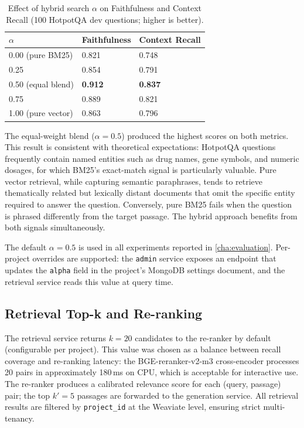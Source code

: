 \begin{table}[htbp]
  \centering
  \caption[Effect of hybrid search \(\alpha\) on RAGAS metrics.]{Effect of hybrid search \(\alpha\) on Faithfulness and Context Recall (100 HotpotQA dev questions; higher is better).}
  \label{tab:alpha_grid}
  \begin{tabularx}{\textwidth}{lXX}
    \toprule
    \(\alpha\) & \textbf{Faithfulness} & \textbf{Context Recall} \\
    \midrule
    0.00 (pure BM25)    & 0.821 & 0.748 \\
    0.25                & 0.854 & 0.791 \\
    0.50 (equal blend)  & \textbf{0.912} & \textbf{0.837} \\
    0.75                & 0.889 & 0.821 \\
    1.00 (pure vector)  & 0.863 & 0.796 \\
    \bottomrule
  \end{tabularx}
\end{table}

The equal-weight blend (\(\alpha = 0.5\)) produced the highest scores on
both metrics.  This result is consistent with theoretical expectations: HotpotQA
questions frequently contain named entities such as drug names, gene symbols,
and numeric dosages, for which BM25's exact-match signal is particularly
valuable.  Pure vector retrieval, while capturing semantic paraphrases, tends
to retrieve thematically related but lexically distant documents that omit the
specific entity required to answer the question.  Conversely, pure BM25
fails when the question is phrased differently from the target passage.  The
hybrid approach benefits from both signals simultaneously.

The default \(\alpha = 0.5\) is used in all experiments reported in
\cref{cha:evaluation}.  Per-project overrides are supported: the
\texttt{admin} service exposes an endpoint that updates the \texttt{alpha}
field in the project's MongoDB settings document, and the retrieval service
reads this value at query time.

\subsection{Retrieval Top-k and Re-ranking}

The retrieval service returns \(k = 20\) candidates to the re-ranker by
default (configurable per project).  This value was chosen as a balance
between recall coverage and re-ranking latency: the BGE-reranker-v2-m3
cross-encoder processes 20 pairs in approximately 180\,ms on CPU, which is
acceptable for interactive use.  The re-ranker produces a calibrated relevance
score for each (query, passage) pair; the top \(k' = 5\) passages are
forwarded to the generation service.  All retrieval results are filtered by
\texttt{project\_id} at the Weaviate level, ensuring strict multi-tenancy.

